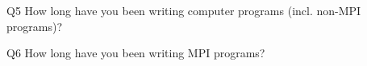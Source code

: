 \begin{description}%
\item{Q5} How long have you been writing computer programs (incl. non-MPI programs)?%
\item{Q6} How long have you been writing MPI programs?%
\end{description}%
